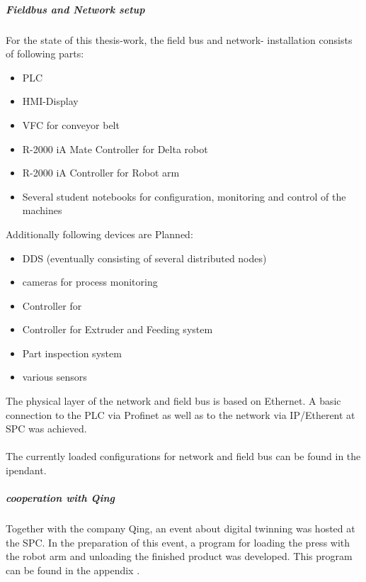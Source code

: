 \subparagraph{Fieldbus and Network setup}

For the state of this thesis-work, the field bus and network- installation consists of following parts:
\begin{itemize}
	\item \ac{PLC}
	\item \ac{HMI}-Display
	\item \ac{VFC} for conveyor belt
	\item R-2000 iA Mate Controller for Delta robot
	\item R-2000 iA Controller for Robot arm
	\item Several student notebooks for configuration, monitoring and control of the machines
\end{itemize}

Additionally following devices are Planned:
\begin{itemize}
	\item \ac{DDS} (eventually consisting of several distributed nodes)
	\item cameras for process monitoring 
	\item Controller for 
	\item Controller for Extruder and Feeding system
	\item Part inspection system
	\item various sensors
\end{itemize}

The physical layer of the network and field bus is based on Ethernet. A basic connection to the PLC via Profinet as well as to the network via IP/Etherent at \ac{SPC} was achieved.\\
\\
The currently loaded configurations for network and field bus can be found in the \ac{ipendant}.

\subparagraph{cooperation with Qing}
Together with the company Qing, an event about digital twinning was hosted at the \ac{SPC}. In the preparation of this event, a program for loading the press with the robot arm and unloading the finished product was developed. This program can be found in the appendix .